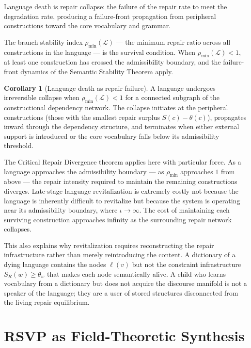 \documentclass[11pt, a4paper]{article}
\theoremstyle{definition}
\newtheorem{corollary}{Corollary}
\theoremstyle{remark}
\begin{document}
Language death is repair collapse: the failure of the repair rate to meet
the degradation rate, producing a failure-front propagation from peripheral
constructions toward the core vocabulary and grammar.

The branch stability index $\rho_{\min}(\mathcal{L})$ --- the minimum repair
ratio across all constructions in the language --- is the survival condition.
When $\rho_{\min}(\mathcal{L}) < 1$, at least one construction has crossed
the admissibility boundary, and the failure-front dynamics of the Semantic
Stability Theorem apply.

\begin{corollary}[Language death as repair failure]
A language undergoes irreversible collapse when $\rho_{\min}(\mathcal{L}) < 1$
for a connected subgraph of the constructional dependency network. The
collapse initiates at the peripheral constructions (those with the smallest
repair surplus $S(c) - \theta(c)$), propagates inward through the dependency
structure, and terminates when either external support is introduced or
the core vocabulary falls below its admissibility threshold.
\end{corollary}

The Critical Repair Divergence theorem applies here with particular force. As
a language approaches the admissibility boundary --- as $\rho_{\min}$ approaches
$1$ from above --- the repair intensity required to maintain the remaining
constructions diverges. Late-stage language revitalization is extremely costly
not because the language is inherently difficult to revitalize but because the
system is operating near its admissibility boundary, where $\iota \to \infty$.
The cost of maintaining each surviving construction approaches infinity as the
surrounding repair network collapses.

This also explains why revitalization requires reconstructing the repair
infrastructure rather than merely reintroducing the content. A dictionary of
a dying language contains the nodes $\ell(v)$ but not the constraint
infrastructure $S_R(w) \geq \theta_w$ that makes each node semantically alive.
A child who learns vocabulary from a dictionary but does not acquire the
discourse manifold is not a speaker of the language; they are a user of stored
structures disconnected from the living repair equilibrium.

\section{RSVP as Field-Theoretic Synthesis}
\end{document}
